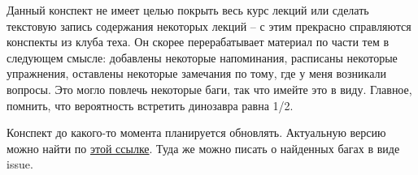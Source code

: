 Данный конспект не имеет целью покрыть весь курс лекций или сделать текстовую запись содержания некоторых лекций -- с этим прекрасно справляются конспекты из клуба теха. Он скорее перерабатывает материал по части тем в следующем смысле: добавлены некоторые напоминания, расписаны некоторые упражнения, оставлены некоторые замечания по тому, где у меня возникали вопросы. Это могло повлечь некоторые баги, так что имейте это в виду. Главное, помнить, что вероятность встретить динозавра равна 1/2.

Конспект до какого-то момента планируется обновлять. Актуальную версию можно найти по \href{https://github.com/zenkovev/Mathematical-statistics}{этой ссылке}. Туда же можно писать о найденных багах в виде issue.